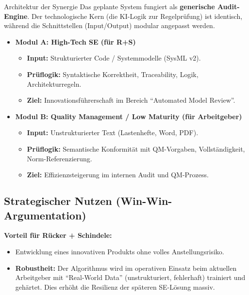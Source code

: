 \documentclass[a4paper,11pt]{article}
\begin{document}
\begin{strategybox}{Architektur der Synergie}
    Das geplante System fungiert als \textbf{generische Audit-Engine}. Der technologische Kern (die KI-Logik zur Regelprüfung) ist identisch, während die Schnittstellen (Input/Output) modular angepasst werden.
    
    \begin{itemize}
        \item \textbf{Modul A: High-Tech SE (für R+S)}
        \begin{itemize}
            \item \textbf{Input:} Strukturierter Code / Systemmodelle (SysML v2).
            \item \textbf{Prüflogik:} Syntaktische Korrektheit, Traceability, Logik, Architekturregeln.
            \item \textbf{Ziel:} Innovationsführerschaft im Bereich \enquote{Automated Model Review}.
        \end{itemize}
        
        \item \textbf{Modul B: Quality Management / Low Maturity (für Arbeitgeber)}
        \begin{itemize}
            \item \textbf{Input:} Unstrukturierter Text (Lastenhefte, Word, PDF).
            \item \textbf{Prüflogik:} Semantische Konformität mit QM-Vorgaben, Vollständigkeit, Norm-Referenzierung.
            \item \textbf{Ziel:} Effizienzsteigerung im internen Audit und QM-Prozess.
        \end{itemize}
    \end{itemize}
\end{strategybox}

\subsection*{Strategischer Nutzen (Win-Win-Argumentation)}

\textbf{Vorteil für Rücker + Schindele:}
\begin{itemize}
    \item Entwicklung eines innovativen Produkts ohne volles Anstellungsrisiko.
    \item \textbf{Robustheit:} Der Algorithmus wird im operativen Einsatz beim aktuellen Arbeitgeber mit \enquote{Real-World Data} (unstrukturiert, fehlerhaft) trainiert und gehärtet. Dies erhöht die Resilienz der späteren SE-Lösung massiv.
\end{itemize}
\end{document}
